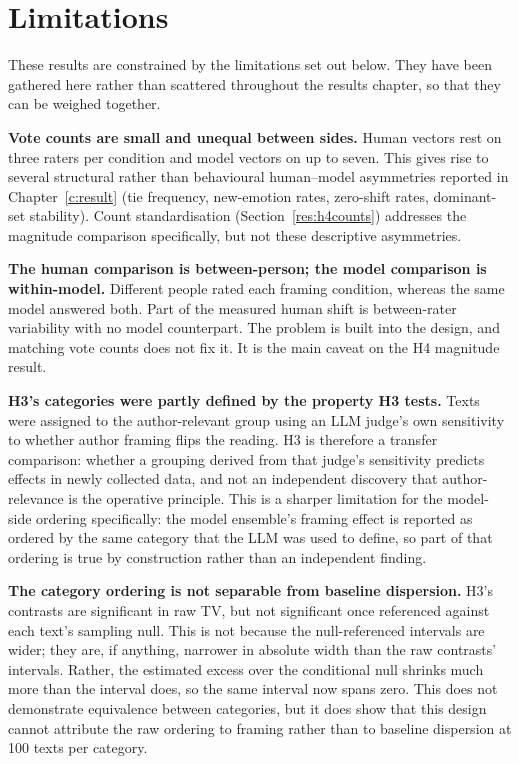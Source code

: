 \section{Limitations}
\label{disc:limitations}

\noindent
These results are constrained by the limitations set out below. They have been gathered here
rather than scattered throughout the results chapter, so that they can be weighed together.

\textbf{Vote counts are small and unequal between sides.} Human vectors rest on three raters per
condition and model vectors on up to seven. This gives rise to several structural rather than
behavioural human--model asymmetries reported in Chapter~\ref{c:result} (tie
frequency, new-emotion rates, zero-shift rates, dominant-set stability). Count standardisation
(Section~\ref{res:h4counts}) addresses the magnitude comparison specifically, but not these
descriptive asymmetries.

\textbf{The human comparison is between-person; the model comparison is within-model.} Different
people rated each framing condition, whereas the same model answered both. Part of the measured
human shift is between-rater variability with no model counterpart. The problem is built into the
design, and matching vote counts does not fix it. It is the main caveat on the H4 magnitude
result.

\textbf{H3's categories were partly defined by the property H3 tests.} Texts were assigned to the
author-relevant group using an LLM judge's own sensitivity to whether author framing flips the
reading. H3 is therefore a transfer comparison: whether a grouping derived from that judge's
sensitivity predicts effects in newly collected data, and not an independent discovery that
author-relevance is the operative principle. This is a sharper limitation for the model-side
ordering specifically: the model ensemble's framing effect is reported as ordered by the same
category that the LLM was used to define, so part of that ordering is true by construction rather
than an independent finding.

\textbf{The category ordering is not separable from baseline dispersion.} H3's contrasts are
significant in raw TV, but not significant once referenced against each text's sampling null. This
is not because the null-referenced intervals are wider; they are, if anything, narrower in
absolute width than the raw contrasts' intervals. Rather, the estimated excess over the
conditional null shrinks much more than the interval does, so the same interval now spans zero.
This does not demonstrate equivalence between categories, but it does show that this design cannot
attribute the raw ordering to framing rather than to baseline dispersion at 100 texts per category.

